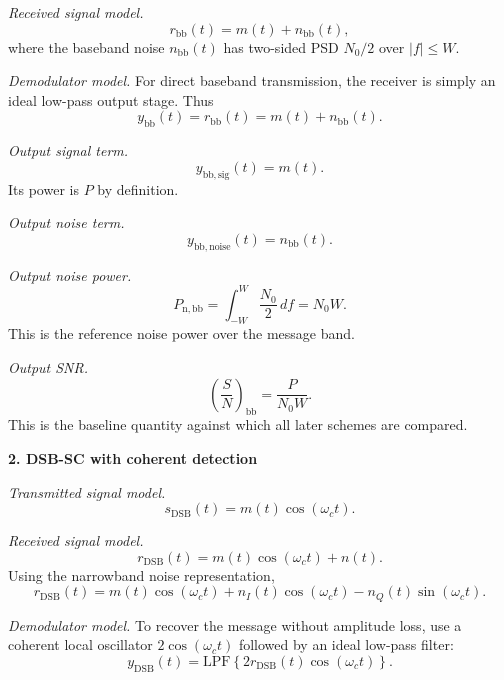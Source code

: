 \begin{tcolorbox}[breakable, colback=cyan!4!white, colframe=cyan!60!black,
title={\textbf{Intuition: Step-by-Step Output SNR Models Under AWGN}}]
\emph{Received signal model.}
\begin{equation}
r_{\mathrm{bb}}(t)=m(t)+n_{\mathrm{bb}}(t),
\end{equation}
where the baseband noise $n_{\mathrm{bb}}(t)$ has two-sided PSD $N_0/2$ over
$\lvert f \rvert \leq W$.

\emph{Demodulator model.}
For direct baseband transmission, the receiver is simply an ideal low-pass
output stage. Thus
\begin{equation}
y_{\mathrm{bb}}(t)=r_{\mathrm{bb}}(t)=m(t)+n_{\mathrm{bb}}(t).
\end{equation}

\emph{Output signal term.}
\begin{equation}
y_{\mathrm{bb, sig}}(t)=m(t).
\end{equation}
Its power is $P$ by definition.

\emph{Output noise term.}
\begin{equation}
y_{\mathrm{bb, noise}}(t)=n_{\mathrm{bb}}(t).
\end{equation}

\emph{Output noise power.}
\begin{equation}
P_{\mathrm{n,bb}}
=
\int_{-W}^{W}\frac{N_0}{2}\,df
=
N_0 W.
\end{equation}
This is the reference noise power over the message band.

\emph{Output SNR.}
\begin{equation}
\left(\frac{S}{N}\right)_{\mathrm{bb}}
=
\frac{P}{N_0 W}.
\label{eq:lab2_snr_baseband_reference}
\end{equation}
This is the baseline quantity against which all later schemes are compared.

\textbf{2. DSB-SC with coherent detection}

\emph{Transmitted signal model.}
\begin{equation}
s_{\mathrm{DSB}}(t)=m(t)\cos(\omega_c t).
\end{equation}

\emph{Received signal model.}
\begin{equation}
r_{\mathrm{DSB}}(t)=m(t)\cos(\omega_c t)+n(t).
\end{equation}
Using the narrowband noise representation,
\begin{equation}
r_{\mathrm{DSB}}(t)
=
m(t)\cos(\omega_c t)
+n_I(t)\cos(\omega_c t)-n_Q(t)\sin(\omega_c t).
\end{equation}

\emph{Demodulator model.}
To recover the message without amplitude loss, use a coherent local oscillator
$2\cos(\omega_c t)$ followed by an ideal low-pass filter:
\begin{equation}
y_{\mathrm{DSB}}(t)=\mathrm{LPF}\left\{2r_{\mathrm{DSB}}(t)\cos(\omega_c t)\right\}.
\end{equation}


\end{tcolorbox}

